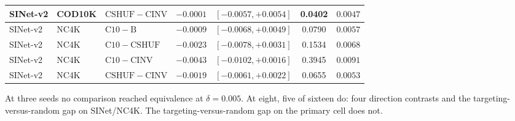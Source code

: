 \begin{table}[t]
\begin{center}
\begin{tabular}{@{}lllcccc@{}}
SINet-v2 & COD10K & $\mathrm{CSHUF}-\mathrm{CINV}$ & $-0.0001$ & $[-0.0057, +0.0054]$ & \textbf{0.0402} & $0.0047$ \\
\midrule
SINet-v2 & NC4K & $\mathrm{C10}-\mathrm{B}$ & $-0.0009$ & $[-0.0068, +0.0049]$ & 0.0790 & $0.0057$ \\
SINet-v2 & NC4K & $\mathrm{C10}-\mathrm{CSHUF}$ & $-0.0023$ & $[-0.0078, +0.0031]$ & 0.1534 & $0.0068$ \\
SINet-v2 & NC4K & $\mathrm{C10}-\mathrm{CINV}$ & $-0.0043$ & $[-0.0102, +0.0016]$ & 0.3945 & $0.0091$ \\
SINet-v2 & NC4K & $\mathrm{CSHUF}-\mathrm{CINV}$ & $-0.0019$ & $[-0.0061, +0.0022]$ & 0.0655 & $0.0053$ \\
\bottomrule
\end{tabular}
\end{center}
\footnotesize At three seeds no comparison reached equivalence at $\delta = 0.005$. At eight,
five of sixteen do: four direction contrasts and the targeting-versus-random gap on SINet/NC4K. The
targeting-versus-random gap on the primary cell does not.
\end{table}
